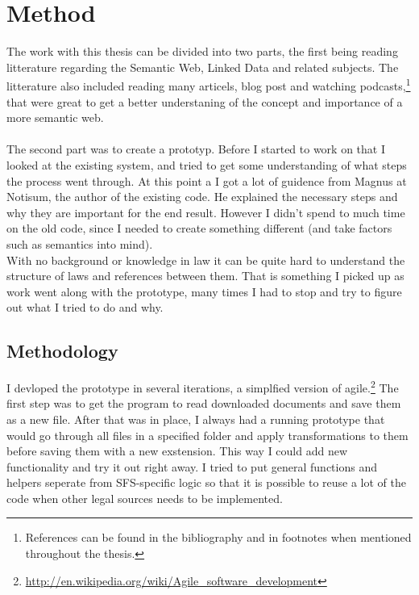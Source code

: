 \chapter{Method}

The work with this thesis can be divided into two parts, the first being reading litterature regarding the Semantic Web, Linked Data and related subjects. The litterature also included reading many articels, blog post and watching podcasts,\footnote{References can be found in the bibliography and in footnotes when mentioned throughout the thesis.} that were great to get a better understaning of the concept and importance of a more semantic web.\\\\  
The second part was to create a prototyp. Before I started to work on that I looked at the existing system, and tried to get some understanding of what steps the process went through. At this point a I got a lot of guidence from Magnus at Notisum, the author of the existing code. He explained the necessary steps and why they are important for the end result. However I didn't spend to much time on the old code, since I needed to create something different (and take factors such as semantics into mind).\\ With no background or knowledge in law it can be quite hard to understand the structure of laws and references between them. That is something I picked up as work went along with the prototype, many times I had to stop and try to figure out what I tried to do and why. 

\section{Methodology}
I devloped the prototype in several iterations, a simplfied version of agile.\footnote{\url{http://en.wikipedia.org/wiki/Agile_software_development}} The first step was to get the program to read downloaded documents and save them as a new file. After that was in place, I always had a running prototype that would go through all files in a specified folder and apply transformations to them before saving them with a new exstension. This way I could add new functionality and try it out right away. I tried to put general functions and helpers seperate from SFS-specific logic so that it is possible to reuse a lot of the code when other legal sources needs to be implemented.     

